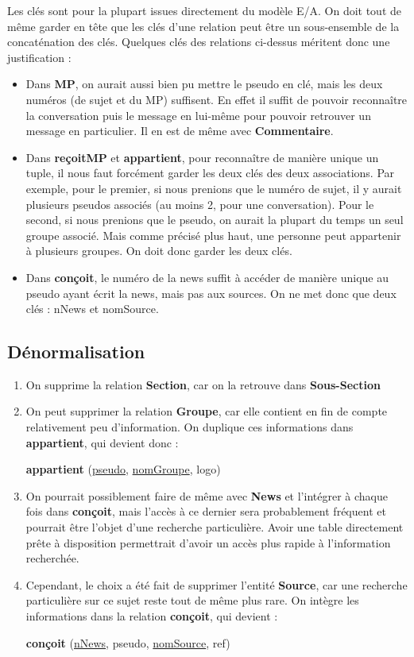 \medskip
Les clés sont pour la plupart issues directement du modèle E/A. On doit tout de même garder en tête que les clés d'une relation peut être un sous-ensemble de la concaténation des clés. Quelques clés des relations ci-dessus méritent donc une justification :
\begin{itemize}
	\item Dans \textbf{MP}, on aurait aussi bien pu mettre le pseudo en clé, mais les deux numéros (de sujet et du MP) suffisent. En effet il suffit de pouvoir reconnaître la conversation puis le message en lui-même pour pouvoir retrouver un message en particulier. Il en est de même avec \textbf{Commentaire}.
	\item Dans \textbf{reçoitMP} et \textbf{appartient}, pour reconnaître de manière unique un tuple, il nous faut forcément garder les deux clés des deux associations. Par exemple, pour le premier, si nous prenions que le numéro de sujet, il y aurait plusieurs pseudos associés (au moins 2, pour une conversation). Pour le second, si nous prenions que le pseudo, on aurait la plupart du temps un seul groupe associé. Mais comme précisé plus haut, une personne peut appartenir à plusieurs groupes. On doit donc garder les deux clés.
	\item Dans \textbf{conçoit}, le numéro de la news suffit à accéder de manière unique au pseudo ayant écrit la news, mais pas aux sources. On ne met donc que deux clés : n\degree News et nomSource.
\end{itemize}

\subsection{Dénormalisation}
\begin{enumerate}
	\item On supprime la relation \textbf{Section}, car on la retrouve dans \textbf{Sous-Section}
	\item On peut supprimer la relation \textbf{Groupe}, car elle contient en fin de compte relativement peu d'information. On duplique ces informations dans \textbf{appartient}, qui devient donc :
	\begin{center} \textbf{appartient}  (\underline{pseudo}, \underline{nomGroupe}, logo) \end{center}
	
	\item On pourrait possiblement faire de même avec \textbf{News} et l'intégrer à chaque fois dans \textbf{conçoit}, mais l'accès à ce dernier sera probablement fréquent et pourrait être l'objet d'une recherche particulière. Avoir une table directement prête à disposition permettrait d'avoir un accès plus rapide à l'information recherchée.
	\item Cependant, le choix a été fait de supprimer l'entité \textbf{Source}, car une recherche particulière sur ce sujet reste tout de même plus rare. On intègre les informations dans la relation \textbf{conçoit}, qui devient :
	\begin{center} \textbf{conçoit} (\underline{n\degree News}, pseudo, \underline{nomSource}, ref)\end{center}
\end{enumerate}

